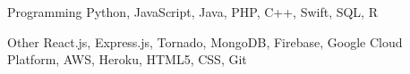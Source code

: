 


\begin{cvskills}


\cvskill
{Programming} %
{Python, JavaScript, Java, PHP, C++, Swift, SQL, R} %


\cvskill
{Other} %
{React.js, Express.js, Tornado, MongoDB, Firebase, Google Cloud Platform, AWS, Heroku, HTML5, CSS, Git} %



\end{cvskills}
